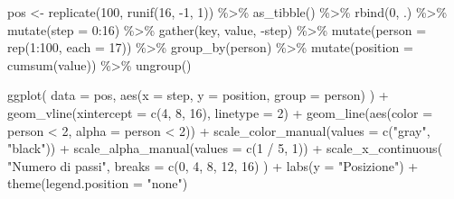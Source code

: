 \documentclass[
  11pt,
]{krantz}
\makeatletter
\newenvironment{Shaded}{\begin{snugshade}}{\end{snugshade}}
\newcommand{\AttributeTok}[1]{\textcolor[rgb]{0.61,0.61,0.61}{#1}}
\newcommand{\DecValTok}[1]{\textcolor[rgb]{0.06,0.06,0.06}{#1}}
\newcommand{\FunctionTok}[1]{\textcolor[rgb]{0,0,0}{#1}}
\newcommand{\NormalTok}[1]{#1}
\newcommand{\OtherTok}[1]{\textcolor[rgb]{0.37,0.37,0.37}{#1}}
\newcommand{\SpecialCharTok}[1]{\textcolor[rgb]{0,0,0}{#1}}
\newcommand{\StringTok}[1]{\textcolor[rgb]{0.5,0.5,0.5}{#1}}
\newenvironment{kframe}{%
\medskip{}
\setlength{\fboxsep}{.8em}
 \def\at@end@of@kframe{}%
 \ifinner\ifhmode%
  \def\at@end@of@kframe{\end{minipage}}%
  \begin{minipage}{\columnwidth}%
 \fi\fi%
 \def\FrameCommand##1{\hskip\@totalleftmargin \hskip-\fboxsep
 \colorbox{shadecolor}{##1}\hskip-\fboxsep
     \hskip-\linewidth \hskip-\@totalleftmargin \hskip\columnwidth}%
 \MakeFramed {\advance\hsize-\width
   \@totalleftmargin\z@ \linewidth\hsize
   \@setminipage}}%
 {\par\unskip\endMakeFramed%
 \at@end@of@kframe}
\renewenvironment{Shaded}{\begin{kframe}}{\end{kframe}}
\theoremstyle{definition}
\theoremstyle{definition}
\theoremstyle{definition}
\theoremstyle{definition}
\theoremstyle{remark}
\makeatother
\begin{document}
\begin{Shaded}
\begin{Highlighting}[]
\NormalTok{pos }\OtherTok{\textless{}{-}}
  \FunctionTok{replicate}\NormalTok{(}\DecValTok{100}\NormalTok{, }\FunctionTok{runif}\NormalTok{(}\DecValTok{16}\NormalTok{, }\SpecialCharTok{{-}}\DecValTok{1}\NormalTok{, }\DecValTok{1}\NormalTok{)) }\SpecialCharTok{\%\textgreater{}\%}
  \FunctionTok{as\_tibble}\NormalTok{() }\SpecialCharTok{\%\textgreater{}\%}
  \FunctionTok{rbind}\NormalTok{(}\DecValTok{0}\NormalTok{, .) }\SpecialCharTok{\%\textgreater{}\%}
  \FunctionTok{mutate}\NormalTok{(}\AttributeTok{step =} \DecValTok{0}\SpecialCharTok{:}\DecValTok{16}\NormalTok{) }\SpecialCharTok{\%\textgreater{}\%}
  \FunctionTok{gather}\NormalTok{(key, value, }\SpecialCharTok{{-}}\NormalTok{step) }\SpecialCharTok{\%\textgreater{}\%}
  \FunctionTok{mutate}\NormalTok{(}\AttributeTok{person =} \FunctionTok{rep}\NormalTok{(}\DecValTok{1}\SpecialCharTok{:}\DecValTok{100}\NormalTok{, }\AttributeTok{each =} \DecValTok{17}\NormalTok{)) }\SpecialCharTok{\%\textgreater{}\%}
  \FunctionTok{group\_by}\NormalTok{(person) }\SpecialCharTok{\%\textgreater{}\%}
  \FunctionTok{mutate}\NormalTok{(}\AttributeTok{position =} \FunctionTok{cumsum}\NormalTok{(value)) }\SpecialCharTok{\%\textgreater{}\%}
  \FunctionTok{ungroup}\NormalTok{()}

\FunctionTok{ggplot}\NormalTok{(}
  \AttributeTok{data =}\NormalTok{ pos,}
  \FunctionTok{aes}\NormalTok{(}\AttributeTok{x =}\NormalTok{ step, }\AttributeTok{y =}\NormalTok{ position, }\AttributeTok{group =}\NormalTok{ person)}
\NormalTok{) }\SpecialCharTok{+}
  \FunctionTok{geom\_vline}\NormalTok{(}\AttributeTok{xintercept =} \FunctionTok{c}\NormalTok{(}\DecValTok{4}\NormalTok{, }\DecValTok{8}\NormalTok{, }\DecValTok{16}\NormalTok{), }\AttributeTok{linetype =} \DecValTok{2}\NormalTok{) }\SpecialCharTok{+}
  \FunctionTok{geom\_line}\NormalTok{(}\FunctionTok{aes}\NormalTok{(}\AttributeTok{color =}\NormalTok{ person }\SpecialCharTok{\textless{}} \DecValTok{2}\NormalTok{, }\AttributeTok{alpha =}\NormalTok{ person }\SpecialCharTok{\textless{}} \DecValTok{2}\NormalTok{)) }\SpecialCharTok{+}
  \FunctionTok{scale\_color\_manual}\NormalTok{(}\AttributeTok{values =} \FunctionTok{c}\NormalTok{(}\StringTok{"gray"}\NormalTok{, }\StringTok{"black"}\NormalTok{)) }\SpecialCharTok{+}
  \FunctionTok{scale\_alpha\_manual}\NormalTok{(}\AttributeTok{values =} \FunctionTok{c}\NormalTok{(}\DecValTok{1} \SpecialCharTok{/} \DecValTok{5}\NormalTok{, }\DecValTok{1}\NormalTok{)) }\SpecialCharTok{+}
  \FunctionTok{scale\_x\_continuous}\NormalTok{(}
    \StringTok{"Numero di passi"}\NormalTok{,}
    \AttributeTok{breaks =} \FunctionTok{c}\NormalTok{(}\DecValTok{0}\NormalTok{, }\DecValTok{4}\NormalTok{, }\DecValTok{8}\NormalTok{, }\DecValTok{12}\NormalTok{, }\DecValTok{16}\NormalTok{)}
\NormalTok{  ) }\SpecialCharTok{+}
  \FunctionTok{labs}\NormalTok{(}\AttributeTok{y =} \StringTok{"Posizione"}\NormalTok{) }\SpecialCharTok{+}
  \FunctionTok{theme}\NormalTok{(}\AttributeTok{legend.position =} \StringTok{"none"}\NormalTok{)}
\end{Highlighting}
\end{Shaded}
\end{document}
